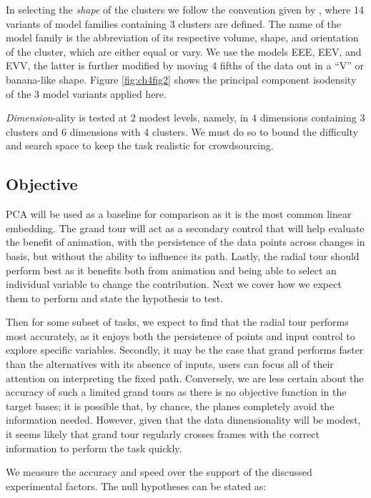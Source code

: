 \documentclass{template/monashthesis}
\begin{document}
In selecting the \emph{shape} of the clusters we follow the convention given by \textcite{scrucca_mclust_2016}, where 14 variants of model families containing 3 clusters are defined. The name of the model family is the abbreviation of its respective volume, shape, and orientation of the cluster, which are either equal or vary. We use the models EEE, EEV, and EVV, the latter is further modified by moving 4 fifths of the data out in a ``V'' or banana-like shape. Figure \ref{fig:ch4fig2} shows the principal component isodensity of the 3 model variants applied here.

\emph{Dimension}-ality is tested at 2 modest levels, namely, in 4 dimensions containing 3 clusters and 6 dimensions with 4 clusters. We must do so to bound the difficulty and search space to keep the task realistic for crowdsourcing.

\hypertarget{sec:objective}{%
\subsection{Objective}\label{sec:objective}}

PCA will be used as a baseline for comparison as it is the most common linear embedding. The grand tour will act as a secondary control that will help evaluate the benefit of animation, with the persistence of the data points across changes in basis, but without the ability to influence its path. Lastly, the radial tour should perform best as it benefits both from animation and being able to select an individual variable to change the contribution. Next we cover how we expect them to perform and state the hypothesis to test.

Then for some subset of tasks, we expect to find that the radial tour performs most accurately, as it enjoys both the persistence of points and input control to explore specific variables. Secondly, it may be the case that grand performs faster than the alternatives with its absence of inputs, users can focus all of their attention on interpreting the fixed path. Conversely, we are less certain about the accuracy of such a limited grand tours as there is no objective function in the target bases; it is possible that, by chance, the planes completely avoid the information needed. However, given that the data dimensionality will be modest, it seems likely that grand tour regularly crosses frames with the correct information to perform the task quickly.

We measure the accuracy and speed over the support of the discussed experimental factors. The null hypotheses can be stated as:
\end{document}
